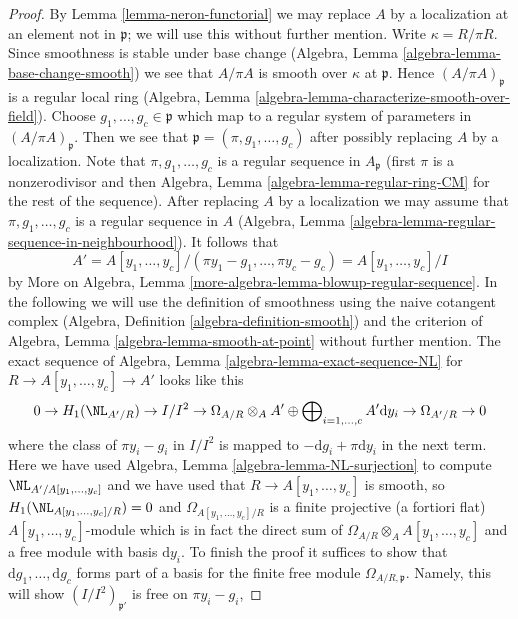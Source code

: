 \begin{proof}
By Lemma \ref{lemma-neron-functorial} we may replace $A$ by a localization
at an element not in $\mathfrak p$; we will use this without further mention.
Write $\kappa = R/\pi R$. Since smoothness is stable under base change
(Algebra, Lemma \ref{algebra-lemma-base-change-smooth})
we see that $A/\pi A$ is smooth over $\kappa$ at $\mathfrak p$.
Hence $(A/\pi A)_\mathfrak p$ is a regular local ring
(Algebra, Lemma \ref{algebra-lemma-characterize-smooth-over-field}).
Choose $g_1, \ldots, g_c \in \mathfrak p$ which map to
a regular system of parameters in $(A/\pi A)_\mathfrak p$.
Then we see that $\mathfrak p = (\pi, g_1, \ldots, g_c)$
after possibly replacing $A$ by a localization.
Note that $\pi, g_1, \ldots, g_c$ is a regular sequence
in $A_\mathfrak p$ (first $\pi$ is a nonzerodivisor and
then Algebra, Lemma \ref{algebra-lemma-regular-ring-CM}
for the rest of the sequence).
After replacing $A$ by a localization we may assume that
$\pi, g_1, \ldots, g_c$ is a regular sequence in $A$
(Algebra, Lemma \ref{algebra-lemma-regular-sequence-in-neighbourhood}).
It follows that
$$
A' = A[y_1, \ldots, y_c]/(\pi y_1 - g_1, \ldots, \pi y_c - g_c) =
A[y_1, \ldots, y_c]/I
$$
by More on Algebra, Lemma \ref{more-algebra-lemma-blowup-regular-sequence}.
In the following we will use the definition of smoothness using the
naive cotangent complex (Algebra, Definition \ref{algebra-definition-smooth})
and the criterion of Algebra, Lemma \ref{algebra-lemma-smooth-at-point}
without further mention.
The exact sequence of Algebra, Lemma \ref{algebra-lemma-exact-sequence-NL}
for $R \to A[y_1, \ldots, y_c] \to A'$ looks like this
$$
0 \to H_1(\NL_{A'/R}) \to I/I^2 \to
\Omega_{A/R} \otimes_A A' \oplus
\bigoplus\nolimits_{i = 1, \ldots, c} A' \text{d}y_i \to
\Omega_{A'/R} \to 0
$$
where the class of $\pi y_i - g_i$ in $I/I^2$ is mapped
to $- \text{d}g_i + \pi \text{d}y_i$ in the next term.
Here we have used Algebra, Lemma \ref{algebra-lemma-NL-surjection}
to compute $\NL_{A'/A[y_1, \ldots, y_c]}$ and we have used that
$R \to A[y_1, \ldots, y_c]$ is smooth, so
$H_1(\NL_{A[y_1, \ldots, y_c]/R}) = 0$ and
$\Omega_{A[y_1, \ldots, y_c]/R}$ is a finite projective (a fortiori flat)
$A[y_1, \ldots, y_c]$-module which is in fact the direct sum
of $\Omega_{A/R} \otimes_A A[y_1, \ldots, y_c]$ and a free
module with basis $\text{d}y_i$. To finish the proof it
suffices to show that $\text{d}g_1, \ldots, \text{d}g_c$
forms part of a basis for the finite free module $\Omega_{A/R, \mathfrak p}$.
Namely, this will show $(I/I^2)_{\mathfrak p'}$ is free on $\pi y_i - g_i$,

\end{proof}
